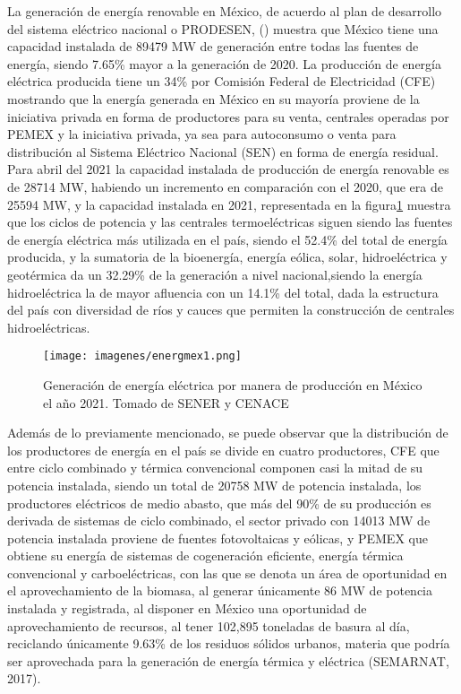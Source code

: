 \vspace{18pt}
La generación de energía renovable en México, de acuerdo al plan de desarrollo del sistema eléctrico nacional o PRODESEN, (\citeyear{prodesen}) muestra que México tiene una capacidad instalada de 89479 MW de generación entre todas las fuentes de energía, siendo 7.65\% mayor a la generación de 2020. La producción de energía eléctrica producida tiene un 34\% por Comisión Federal de Electricidad (CFE) mostrando que la energía generada en México en su mayoría proviene de la iniciativa privada en forma de productores para su venta, centrales operadas por PEMEX y la iniciativa privada, ya sea para autoconsumo o venta para distribución al Sistema Eléctrico Nacional (SEN) en forma de energía residual. Para abril del 2021 la capacidad instalada de producción de energía renovable es de 28714 MW, habiendo un incremento en comparación con el 2020, que era de 25594 MW, y la capacidad instalada en 2021, representada en la figura\ref{fig:imagenes-energmex1} muestra que los ciclos de potencia y las centrales termoeléctricas siguen siendo las fuentes de energía eléctrica más utilizada en el país, siendo el 52.4\% del total de energía producida, y la sumatoria de la bioenergía, energía eólica, solar, hidroeléctrica y geotérmica da un 32.29\% de la generación a nivel nacional,siendo la energía hidroeléctrica la de mayor afluencia con un 14.1\% del total, dada la estructura del país con diversidad de ríos y cauces que permiten la construcción de centrales hidroeléctricas.

\begin{figure}[H]
    \centering
    \texttt{[image: imagenes/energmex1.png]}
    \caption{Generación de energía eléctrica por manera de producción en México el año 2021. \linebreak Tomado de SENER y CENACE \citeyear{prodesen}} 
    \label{fig:imagenes-energmex1}
\end{figure}

\vspace{18pt}
Además de lo previamente mencionado, se puede observar que la distribución de los productores de energía en el país se divide en cuatro productores, CFE que entre ciclo combinado y térmica convencional componen casi la mitad de su potencia instalada, siendo un total de 20758 MW de potencia instalada, los productores eléctricos de medio abasto, que más del 90\% de su producción es derivada de sistemas de ciclo combinado, el sector privado con 14013 MW de potencia instalada proviene de fuentes fotovoltaicas y eólicas, y PEMEX que obtiene su energía de sistemas de cogeneración eficiente, energía térmica convencional y carboeléctricas, con las que se denota un área de oportunidad en el aprovechamiento de la biomasa, al generar únicamente 86 MW de potencia instalada y registrada, al disponer en México una oportunidad de aprovechamiento de recursos, al tener 102,895 toneladas de basura al día, reciclando únicamente 9.63\% de los residuos sólidos urbanos, materia que podría ser aprovechada para la generación de energía térmica y eléctrica (SEMARNAT, 2017).

